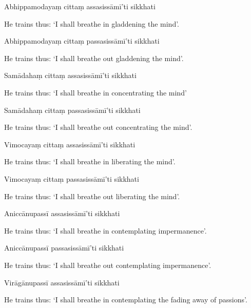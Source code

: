 Abhippamodayaṃ cittaṃ assasissāmī'ti sikkhati

\begin{english}
  He trains thus: `I shall breathe in gladdening the mind'.
\end{english}

Abhippamodayaṃ cittaṃ passasissāmī'ti sikkhati

\begin{english}
  He trains thus: `I shall breathe out gladdening the mind'.
\end{english}

Samādahaṃ cittaṃ assasissāmī'ti sikkhati

\begin{english}
  He trains thus: `I shall breathe in concentrating the mind'
\end{english}

Samādahaṃ cittaṃ passasissāmī'ti sikkhati

\begin{english}
  He trains thus: `I shall breathe out concentrating the mind'.
\end{english}

Vimocayaṃ cittaṃ assasissāmī'ti sikkhati

\begin{english}
  He trains thus: `I shall breathe in liberating the mind'.
\end{english}

Vimocayaṃ cittaṃ passasissāmī'ti sikkhati

\begin{english}
  He trains thus: `I shall breathe out liberating the mind'.
\end{english}

Aniccānupassī assasissāmī'ti sikkhati

\begin{english}
  He trains thus: `I shall breathe in contemplating impermanence'.
\end{english}

Aniccānupassī passasissāmī'ti sikkhati

\begin{english}
  He trains thus: `I shall breathe out contemplating impermanence'.
\end{english}

Virāgānupassī assasissāmī'ti sikkhati

\begin{english}
  He trains thus: `I shall breathe in contemplating the fading away of passions'.
\end{english}

